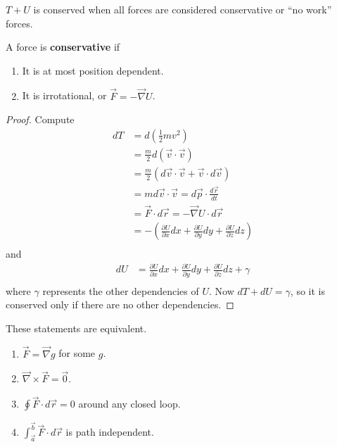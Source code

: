 \begin{prop}
$T + U$ is conserved when all forces are considered conservative or ``no
work'' forces.
\end{prop}

\begin{df}
A force is \textbf{conservative} if
\begin{enumerate}
\item It is at most position dependent.
\item It is irrotational, or $\vec{F} = -\vec{\nabla}U$.
\end{enumerate}
\end{df}

\begin{proof}
Compute
\[ \begin{aligned}
dT &= d\left(\frac{1}{2} mv^2\right) \\
&= \frac{m}{2}d(\vec{v} \cdot \vec{v}) \\
&= \frac{m}{2}(d\vec{v} \cdot \vec{v} + \vec{v} \cdot d\vec{v}) \\
&= md\vec{v} \cdot \vec{v} = d\vec{p} \cdot \frac{d\vec{r}}{dt} \\
&= \vec{F} \cdot d\vec{r} = -\vec{\nabla}U \cdot d\vec{r} \\
&= -\left(\frac{\partial U}{\partial x}dx + \frac{\partial U}{\partial
y}dy + \frac{\partial U}{\partial z}dz \right) \\
\end{aligned} \]
and
\[ \begin{aligned}
dU &= \frac{\partial U}{\partial x}dx + \frac{\partial U}{\partial y}dy
+ \frac{\partial U}{\partial z}dz + \gamma \\
\end{aligned} \]
where $\gamma$ represents the other dependencies of $U$.  Now $dT + dU =
\gamma$, so it is conserved only if there are no other dependencies.
\end{proof}

\begin{thm}
These statements are equivalent.
\begin{enumerate}
\item $\vec{F} = \vec{\nabla}g$ for some $g$.
\item $\vec{\nabla} \times \vec{F} = \vec{0}$.
\item $\oint \vec{F} \cdot d\vec{r} = 0$ around any closed loop.
\item $\int_{\vec{a}}^{\vec{b}} \vec{F} \cdot d\vec{r}$ is path
independent.
\end{enumerate}
\end{thm}
